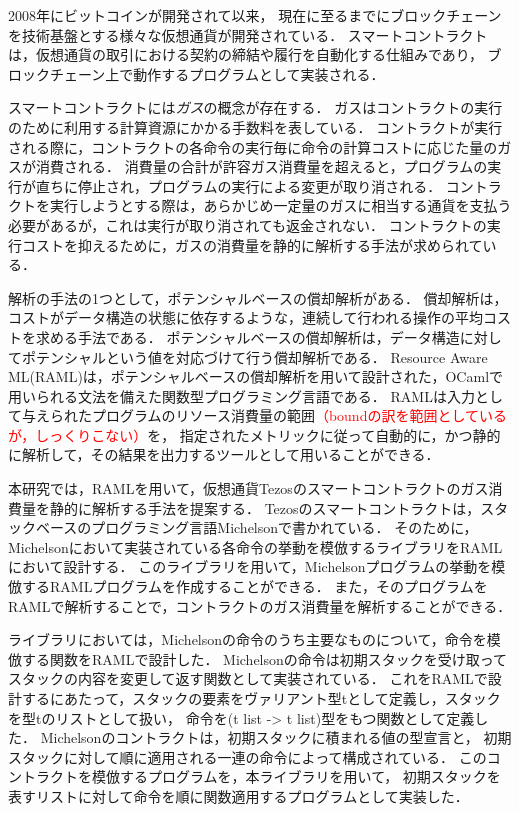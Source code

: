 \documentclass{kuisthesis}
\date{2021年2月2日}
\begin{document}
\maketitle

\begin{jabstract}
2008年にビットコインが開発されて以来，
現在に至るまでにブロックチェーンを技術基盤とする様々な仮想通貨が開発されている．
スマートコントラクトは，仮想通貨の取引における契約の締結や履行を自動化する仕組みであり，
ブロックチェーン上で動作するプログラムとして実装される．

スマートコントラクトには\emph{ガス}の概念が存在する．
ガスはコントラクトの実行のために利用する計算資源にかかる手数料を表している．
コントラクトが実行される際に，コントラクトの各命令の実行毎に命令の計算コストに応じた量のガスが消費される．
消費量の合計が許容ガス消費量を超えると，プログラムの実行が直ちに停止され，プログラムの実行による変更が取り消される．
コントラクトを実行しようとする際は，あらかじめ一定量のガスに相当する通貨を支払う必要があるが，これは実行が取り消されても返金されない．
コントラクトの実行コストを抑えるために，ガスの消費量を静的に解析する手法が求められている．

解析の手法の1つとして，ポテンシャルベースの償却解析がある．
償却解析は，コストがデータ構造の状態に依存するような，連続して行われる操作の平均コストを求める手法である．
ポテンシャルベースの償却解析は，データ構造に対してポテンシャルという値を対応づけて行う償却解析である．
Resource Aware ML(RAML)は，ポテンシャルベースの償却解析を用いて設計された，OCamlで用いられる文法を備えた関数型プログラミング言語である．
RAMLは入力として与えられたプログラムのリソース消費量の範囲\textcolor{red}{（boundの訳を範囲としているが，しっくりこない）}を，
指定されたメトリックに従って自動的に，かつ静的に解析して，その結果を出力するツールとして用いることができる．

本研究では，RAMLを用いて，仮想通貨Tezosのスマートコントラクトのガス消費量を静的に解析する手法を提案する．
Tezosのスマートコントラクトは，スタックベースのプログラミング言語Michelsonで書かれている．
そのために，Michelsonにおいて実装されている各命令の挙動を模倣するライブラリをRAMLにおいて設計する．
このライブラリを用いて，Michelsonプログラムの挙動を模倣するRAMLプログラムを作成することができる．
また，そのプログラムをRAMLで解析することで，コントラクトのガス消費量を解析することができる．

ライブラリにおいては，Michelsonの命令のうち主要なものについて，命令を模倣する関数をRAMLで設計した．
Michelsonの命令は初期スタックを受け取ってスタックの内容を変更して返す関数として実装されている．
これをRAMLで設計するにあたって，スタックの要素をヴァリアント型tとして定義し，スタックを型tのリストとして扱い，
命令を(t list -> t list)型をもつ関数として定義した．
Michelsonのコントラクトは，初期スタックに積まれる値の型宣言と，
初期スタックに対して順に適用される一連の命令によって構成されている．
このコントラクトを模倣するプログラムを，本ライブラリを用いて，
初期スタックを表すリストに対して命令を順に関数適用するプログラムとして実装した．


\end{jabstract}
\end{document}
